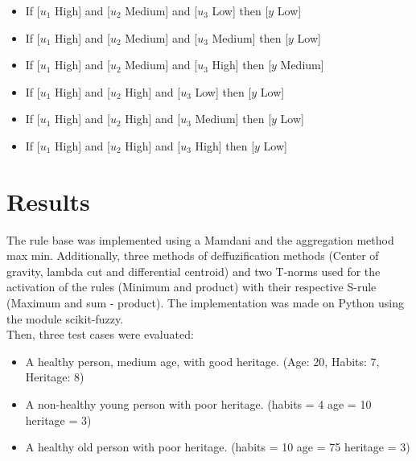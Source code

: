 \documentclass[conference]{IEEEtran}
\begin{document}
\begin{itemize}
\item If [$u_1$ High] and [$u_2$ Medium] and [$u_3$ Low] then [$y$ Low]
\item If [$u_1$ High] and [$u_2$ Medium] and [$u_3$ Medium] then [$y$ Low]
\item If [$u_1$ High] and [$u_2$ Medium] and [$u_3$ High] then [$y$ Medium]
\item If [$u_1$ High] and [$u_2$ High] and [$u_3$ Low] then [$y$ Low]
\item If [$u_1$ High] and [$u_2$ High] and [$u_3$ Medium] then [$y$ Low]
\item If [$u_1$ High] and [$u_2$ High] and [$u_3$ High] then [$y$ Low]
\end{itemize}

\section{Results}
The rule base was implemented using a Mamdani and the aggregation method max min. Additionally, three methods of deffuzification methods (Center of gravity, lambda cut and differential centroid) and two T-norms used for the activation of the rules (Minimum and product) with their respective S-rule (Maximum and sum - product). The implementation was made on Python using the module scikit-fuzzy. \\

Then, three test cases were evaluated:
\begin{itemize}
    \item A healthy person, medium age, with good heritage. (Age: 20, Habits: 7, Heritage: 8)
    \item A non-healthy young person with poor heritage. (habits = 4 age = 10 heritage = 3)
    \item A healthy old person with poor heritage. (habits = 10 age = 75 heritage = 3)
\end{itemize}
\end{document}
